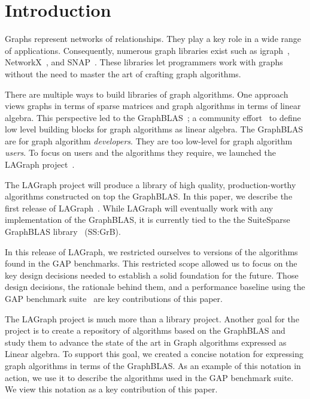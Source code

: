 \section{Introduction}
\label{sec:introduction}

Graphs represent networks of relationships. They play a key role in 
a wide range of applications.   Consequently, numerous graph libraries exist 
such as igraph~\cite{igraph}, NetworkX~\cite{DBLP:reference/snam/X18xv}, and SNAP~\cite{DBLP:journals/tist/LeskovecS16}.
These libraries let programmers work with graphs without the need to master the art of crafting graph algorithms.

There are multiple ways to build libraries of graph algorithms.  One approach
views graphs in terms of sparse matrices and graph algorithms in terms of 
linear algebra. This perspective led to the 
GraphBLAS~\cite{DBLP:conf/hpec/MattsonBBBDFFGGHKLLPPRSWY13,DBLP:conf/hpec/MattsonYMBM17}; 
a community effort~\cite{GraphBLASforum} to define low level building blocks for graph algorithms as linear algebra.
The GraphBLAS are for graph algorithm \emph{developers}.  They are too 
low-level for graph algorithm \emph{users}.  To focus on users and the 
algorithms they require, we launched the
LAGraph project~\cite{DBLP:conf/ipps/MattsonDKBMMY19}.  

The LAGraph project will produce a library 
of high quality, production-worthy algorithms constructed on top 
the GraphBLAS.  In this paper, we describe the first release of LAGraph~\cite{LAGraphRepo}.
While LAGraph will eventually work with any implementation of the GraphBLAS, it is currently tied to the
the SuiteSparse GraphBLAS library~\cite{SuiteSparseGraphBLAS} (SS:GrB).

In this release of LAGraph, we restricted ourselves to versions of the algorithms found in the GAP benchmarks.
This restricted scope allowed us to focus on the key design decisions needed to establish a solid
foundation for the future.  Those design decisions, the rationale behind them, and a performance baseline 
using the GAP benchmark suite~\cite{DBLP:journals/corr/BeamerAP15} are key contributions of this paper.   

The LAGraph project is much more than a library project.   Another goal for the project is to 
create a repository of algorithms based on the GraphBLAS and study them to advance the state of the art in 
Graph algorithms expressed as Linear algebra. To support this goal, we created a concise notation for expressing
graph algorithms in terms of the GraphBLAS.   As an example of this notation in action, we use it to describe 
the algorithms used in the GAP benchmark suite.  We view this notation as a key contribution of this paper.  


